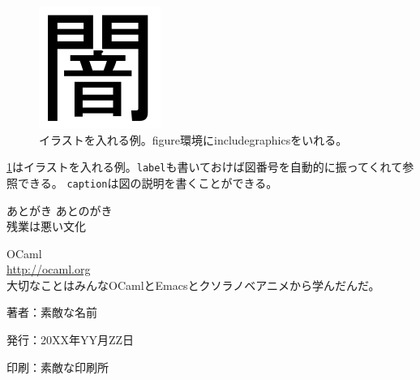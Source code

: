 \documentclass[9pt,b5paper,dvipdfmx,openany]{jsbook}
\newcommand{\prog}[1]{\colorbox[gray]{0.8}{\lstinline{#1}}}
\begin{document}
\begin{figure}[ht]
 \centering
 \includegraphics[scale=0.7]{yami.pdf}
 \caption{イラストを入れる例。figure環境にincludegraphicsをいれる。}
 \label{fig:yami}
\end{figure}

\ref{fig:yami}はイラストを入れる例。\prog{label}も書いておけば図番号を自動的に振ってくれて参照できる。
\prog{caption}は図の説明を書くことができる。

\begin{itembox}[l]{あとがき}
  あとのがき \\
  残業は悪い文化
\end{itembox}

\begin{thebibliography}{9}
   OCaml \\
    \href{http://ocaml.org}{http://ocaml.org} \\
    大切なことはみんなOCamlとEmacsとクソラノベアニメから学んだんだ。
\end{thebibliography}

\thispagestyle{empty}
\begin{flushright}
  \begin{minipage}{0.5\hsize}
    \begin{description}
    \item{著者：}素敵な名前
    \item{発行：}20XX年YY月ZZ日
    \item{印刷：}素敵な印刷所
    \end{description}
  \end{minipage}
\end{flushright}
\end{document}
